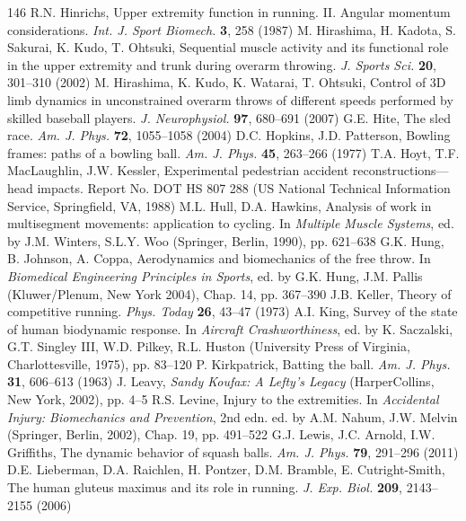 \documentclass[12pt]{book}
\begin{document}
\begin{thebibliography}{146}
 R.N. Hinrichs, Upper extremity function in running. II. Angular momentum considerations. \textit{Int. J. Sport Biomech.} \textbf{3}, 258 (1987)
 M. Hirashima, H. Kadota, S. Sakurai, K. Kudo, T. Ohtsuki, Sequential muscle activity and its functional role in the upper extremity and trunk during overarm throwing. \textit{J. Sports Sci.} \textbf{20}, 301--310 (2002)
 M. Hirashima, K. Kudo, K. Watarai, T. Ohtsuki, Control of 3D limb dynamics in unconstrained overarm throws of different speeds performed by skilled baseball players. \textit{J. Neurophysiol.} \textbf{97}, 680--691 (2007)
 G.E. Hite, The sled race. \textit{Am. J. Phys.} \textbf{72}, 1055--1058 (2004)
 D.C. Hopkins, J.D. Patterson, Bowling frames: paths of a bowling ball. \textit{Am. J. Phys.} \textbf{45}, 263--266 (1977)
 T.A. Hoyt, T.F. MacLaughlin, J.W. Kessler, Experimental pedestrian accident reconstructions---head impacts. Report No. DOT HS 807 288 (US National Technical Information Service, Springfield, VA, 1988)
 M.L. Hull, D.A. Hawkins, Analysis of work in multisegment movements: application to cycling. In \textit{Multiple Muscle Systems}, ed. by J.M. Winters, S.L.Y. Woo (Springer, Berlin, 1990), pp. 621--638
 G.K. Hung, B. Johnson, A. Coppa, Aerodynamics and biomechanics of the free throw. In \textit{Biomedical Engineering Principles in Sports}, ed. by G.K. Hung, J.M. Pallis (Kluwer/Plenum, New York 2004), Chap. 14, pp. 367--390
 J.B. Keller, Theory of competitive running. \textit{Phys. Today} \textbf{26}, 43--47 (1973)
 A.I. King, Survey of the state of human biodynamic response. In \textit{Aircraft Crashworthiness}, ed. by K. Saczalski, G.T. Singley III, W.D. Pilkey, R.L. Huston (University Press of Virginia, Charlottesville, 1975), pp. 83--120
 P. Kirkpatrick, Batting the ball. \textit{Am. J. Phys.} \textbf{31}, 606--613 (1963)
 J. Leavy, \textit{Sandy Koufax: A Lefty's Legacy} (HarperCollins, New York, 2002), pp. 4--5
 R.S. Levine, Injury to the extremities. In \textit{Accidental Injury: Biomechanics and Prevention}, 2nd edn. ed. by A.M. Nahum, J.W. Melvin (Springer, Berlin, 2002), Chap. 19, pp. 491--522
 G.J. Lewis, J.C. Arnold, I.W. Griffiths, The dynamic behavior of squash balls. \textit{Am. J. Phys.} \textbf{79}, 291--296 (2011)
 D.E. Lieberman, D.A. Raichlen, H. Pontzer, D.M. Bramble, E. Cutright-Smith, The human gluteus maximus and its role in running. \textit{J. Exp. Biol.} \textbf{209}, 2143--2155 (2006)

\end{thebibliography}
\end{document}
